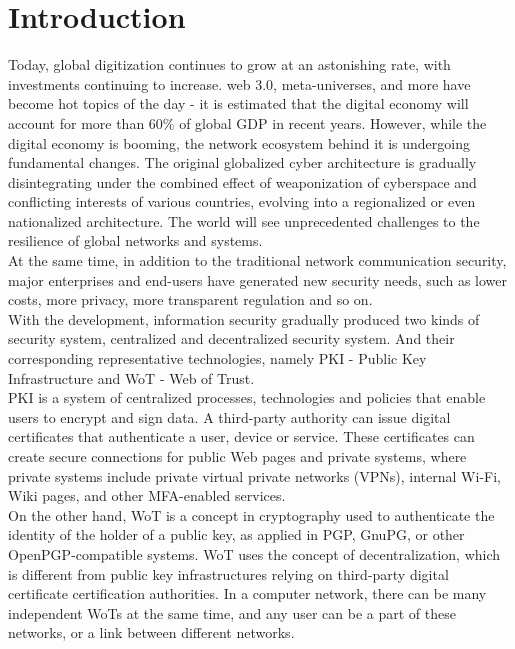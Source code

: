 \section{Introduction}
Today, global digitization continues to grow at an astonishing rate, with investments 
continuing to increase. web 3.0, meta-universes, and more have become hot topics of 
the day - it is estimated that the digital economy will account for more than 60\% 
of global GDP in recent years\cite{b15}. However, while the digital economy is booming, the network 
ecosystem behind it is undergoing fundamental changes. The original globalized cyber 
architecture is gradually disintegrating under the combined effect of weaponization of 
cyberspace and conflicting interests of various countries, evolving into a regionalized 
or even nationalized architecture. The world will see unprecedented challenges to the resilience 
of global networks and systems\cite{b5}.
\\
At the same time, in addition to the traditional network communication security, 
major enterprises and end-users have generated new security needs, such as lower costs, 
more privacy, more transparent regulation and so on.
\\
With the development, information security gradually produced two kinds of security 
system, centralized and decentralized security system. And their corresponding 
representative technologies, namely PKI - Public Key Infrastructure and WoT - Web of Trust.
\\
PKI is a system of centralized processes, technologies and policies that enable users 
to encrypt and sign data\cite{b5}. A third-party authority can issue digital certificates that 
authenticate a user, device or service. These certificates can create secure connections 
for public Web pages and private systems, where private systems include private virtual 
private networks (VPNs), internal Wi-Fi, Wiki pages, and other MFA-enabled services\cite{b6}.
\\
On the other hand, WoT is a concept in cryptography used to authenticate the identity 
of the holder of a public key, as applied in PGP\cite{b7}, GnuPG\cite{b8}, or other OpenPGP-compatible 
systems\cite{b9}. WoT uses the concept of decentralization, which is different from public key 
infrastructures relying on third-party digital certificate certification authorities. 
In a computer network, there can be many independent WoTs at the same time, and any user 
can be a part of these networks, or a link between different networks\cite{b7}.
\\
